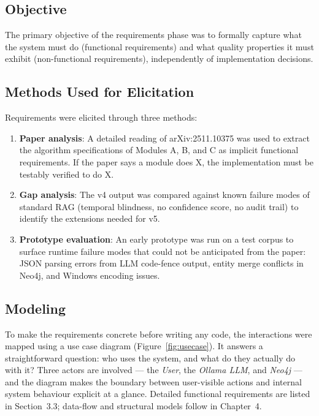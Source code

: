 \subsection{Objective}

The primary objective of the requirements phase was to formally capture what the
system must do (functional requirements) and what quality properties it must
exhibit (non-functional requirements), independently of implementation decisions.

\subsection{Methods Used for Elicitation}

Requirements were elicited through three methods:

\begin{enumerate}
    \item \textbf{Paper analysis}: A detailed reading of arXiv:2511.10375 was
    used to extract the algorithm specifications of Modules A, B, and C as
    implicit functional requirements. If the paper says a module does X, the
    implementation must be testably verified to do X.
    \item \textbf{Gap analysis}: The v4 output was compared against known
    failure modes of standard RAG (temporal blindness, no confidence score,
    no audit trail) to identify the extensions needed for v5.
    \item \textbf{Prototype evaluation}: An early prototype was run on a
    test corpus to surface runtime failure modes that could not be anticipated
    from the paper: JSON parsing errors from LLM code-fence output, entity
    merge conflicts in Neo4j, and Windows encoding issues.
\end{enumerate}

\subsection{Modeling}

To make the requirements concrete before writing any code, the interactions
were mapped using a use case diagram (Figure~\ref{fig:usecase}). It answers
a straightforward question: who uses the system, and what do they actually
do with it? Three actors are involved --- the \emph{User}, the \emph{Ollama
LLM}, and \emph{Neo4j} --- and the diagram makes the boundary between
user-visible actions and internal system behaviour explicit at a glance.
Detailed functional requirements are listed in Section~3.3; data-flow
and structural models follow in Chapter~4.

